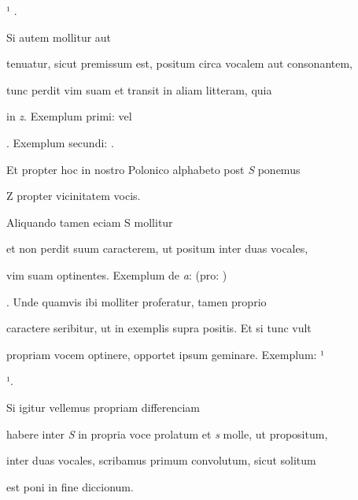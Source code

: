 ¹   .

\indentK Si autem mollitur aut

\fulllines
tenuatur, sicut premissum est, positum circa vocalem aut consonantem,

tunc perdit vim suam et transit in aliam litteram, quia

in \textit{z}. Exemplum primi:  vel  

 . Exemplum secundi:   .

Et propter hoc in nostro Polonico alphabeto post \textit{S} ponemus

\splitlines

Z propter vicinitatem vocis.

\indentK Aliquando tamen eciam S mollitur

\fulllines

et non perdit suum caracterem, ut positum inter duas vocales,

vim suam optinentes. Exemplum de \textit{a}:   (pro: ) 

. Unde quamvis ibi molliter proferatur, tamen proprio

caractere seribitur, ut in exemplis supra positis. Et si tunc vult

propriam vocem optinere, opportet ipsum geminare. Exemplum: ¹

\newpage
\splitlines

 ¹.

\indentK Si igitur vellemus propriam differenciam

\fulllines

habere inter \textit{S} in propria voce prolatum et \textit{s} molle, ut propositum,





\fullpreviouslines

{
\color{blue}

inter duas vocales, scribamus primum convolutum, sicut solitum

est poni in fine diccionum.

}


